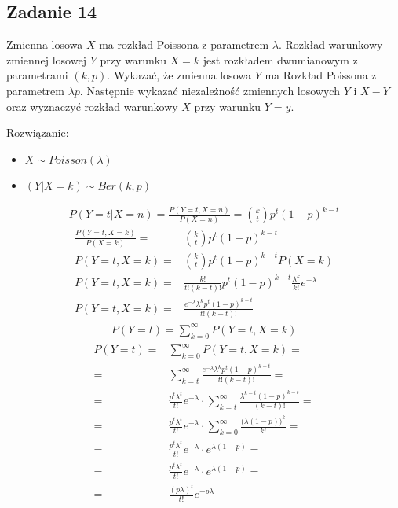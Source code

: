 \subsection*{Zadanie 14}
Zmienna losowa $ X $ ma rozkład Poissona z parametrem $ \lambda $. Rozkład warunkowy zmiennej losowej $ Y $ przy warunku $ X=k $ jest rozkładem dwumianowym z parametrami $ (k,p) $. Wykazać, że zmienna losowa $ Y $ ma Rozkład Poissona z parametrem $ \lambda p $. Następnie wykazać niezależność zmiennych losowych $ Y $ i $ X-Y $ oraz wyznaczyć rozkład warunkowy $ X $ przy warunku $ Y=y $.

Rozwiązanie:
\begin{itemize}
\item $ X\sim Poisson(\lambda) $
\item $ (Y|X=k)\sim Ber(k,p) $
\end{itemize}
\begin{gather*}
P\left(Y=t|X=n\right)=
\frac{P\left(Y=t,X=n\right)}{P\left(X=n\right)}=
\binom{k}{t}p^t(1-p)^{k-t}
\end{gather*}
\begin{align*}
\frac{P\left(Y=t,X=k\right)}{P\left(X=k\right)}=&
\binom{k}{t}p^t(1-p)^{k-t}\\
P\left(Y=t,X=k\right)=&
\binom{k}{t}p^t(1-p)^{k-t}P\left(X=k\right)\\
P\left(Y=t,X=k\right)=&
\frac{k!}{t!(k-t)!}p^t(1-p)^{k-t}\frac{\lambda^k}{k!}e^{-\lambda}\\
P\left(Y=t,X=k\right)=&
\frac{e^{-\lambda } \lambda ^k p^t (1-p)^{k-t}}{t! (k-t)!}
\end{align*}
\begin{gather*}
P\left(Y=t\right)=\sum_{k=0}^{\infty }P\left(Y=t,X=k\right)
\end{gather*}\begin{align*}
P\left(Y=t\right)=&\sum_{k=0}^{\infty }P\left(Y=t,X=k\right)
=\\=&
\sum_{k=t}^{\infty }\frac{e^{-\lambda } \lambda ^k p^t (1-p)^{k-t}}{t! (k-t)!}
=\\=&
\frac{ p^t\lambda^t}{t!}e^{-\lambda}\cdot
\sum_{k=t}^{\infty }\frac{ \lambda ^{k-t} (1-p)^{k-t}}{ (k-t)!}
=\\=&
\frac{ p^t\lambda^t}{t!}e^{-\lambda}\cdot
\sum_{k=0}^{\infty }\frac{ \bigl(\lambda (1-p)\bigr)^{k}}{k!}
=\\=&
\frac{ p^t\lambda^t}{t!}e^{-\lambda}\cdot
e^{\lambda (1-p)}
=\\=&
\frac{ p^t\lambda^t}{t!}e^{-\lambda}\cdot
e^{\lambda (1-p)}
=\\=&
\frac{ (p\lambda)^t}{t!}e^{-p\lambda}
\end{align*}
